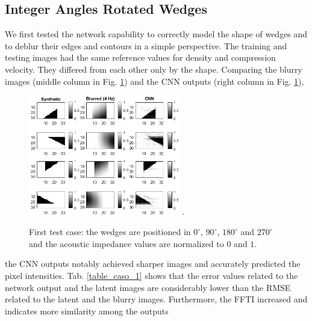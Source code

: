 \documentclass[conference]{IEEEtran}
\begin{document}
\subsection{Integer Angles Rotated Wedges} \label{IARW}
We first tested the network capability to correctly model the shape of wedges
and to deblur their edges and contours in a simple perspective.
The training and testing images had the same reference values for
density and compression velocity. They differed from each other only by the shape.
Comparing the blurry images (middle column in Fig. \ref{fig_scenario1}) and the CNN outputs (right column in Fig. \ref{fig_scenario1}),
\begin{figure}[!t]
	\centering
	\includegraphics[width=2.6in]{Figs/teste1}
	\DeclareGraphicsExtensions.
	\caption{First test case: the wedges are positioned in 
		$0^{\circ}$, $90^{\circ}$, $180^{\circ}$ and $270^{\circ}$ and the acoustic impedance values are normalized to $0$ and $1$.}
	\label{fig_scenario1}
\end{figure}
the CNN outputs notably achieved sharper images and accurately
predicted the pixel intensities. Tab. \ref{table_caso_1} shows that the error values related to the network output and the latent images are considerably lower than the RMSE related to the latent and the blurry images. Furthermore, the FFTI increased and indicates more similarity among the outputs
\end{document}
